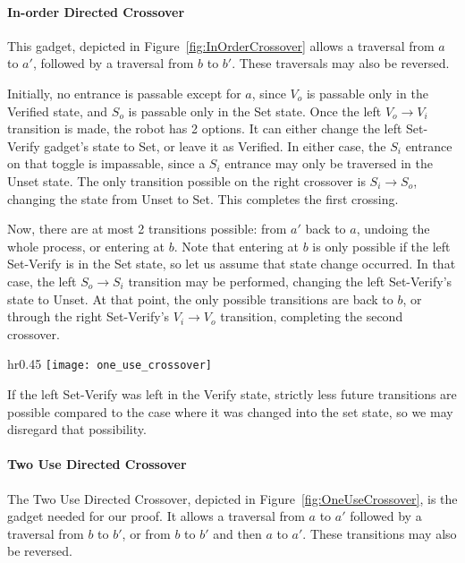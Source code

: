 \paragraph{In-order Directed Crossover} This gadget, depicted in Figure~\ref{fig:InOrderCrossover} allows a traversal from $a$ to $a'$, followed by a traversal from $b$ to $b'$. These traversals may also be reversed.

Initially, no entrance is passable except for $a$, since $V_o$ is passable only in the Verified state, and $S_o$ is
passable only in the Set state. Once the left $V_o \rightarrow V_i$ transition is made, the robot has 2 options.
It can either change the left Set-Verify gadget's state to Set, or leave it as Verified. In either case, the $S_i$
entrance on that toggle is impassable, since a $S_i$ entrance may only be traversed in the Unset state. The
only transition possible on the right crossover is $S_i \rightarrow S_o$, changing the state from Unset to Set.
This completes the first crossing.

Now, there are at most 2 transitions possible: from $a'$ back to $a$, undoing the whole process, or entering at $b$. Note that entering at $b$ is only possible if the left Set-Verify is in the Set state, so let us assume that state change occurred. In that case, the left $S_o \rightarrow S_i$ transition may be performed, changing the left Set-Verify's state to Unset. At that point, the only possible transitions are back to $b$, or through the right Set-Verify's
$V_i \rightarrow V_o$ transition, completing the second crossover.

\begin{wrapfigure}{hr}{0.45\textwidth}
\vspace{-5mm}
  \centering
    \texttt{[image: one\_use\_crossover]}
    \caption{The two use directed crossover is constructed from a directed destructive crossover and two in-order directed crossovers.}
    \label{fig:OneUseCrossover}
    \vspace{-7mm}
\end{wrapfigure}

If the left Set-Verify was left in the Verify state, strictly less future transitions are possible compared to the case where it was changed into the set state, so we may disregard that possibility.


\paragraph{Two Use Directed Crossover} 
The Two Use Directed Crossover, depicted in Figure~\ref{fig:OneUseCrossover}, is the gadget needed for our proof. It allows a traversal from $a$ to $a'$ followed by a traversal from $b$ to $b'$, or from $b$ to $b'$ and then $a$ to $a'$. These transitions may also be reversed.

